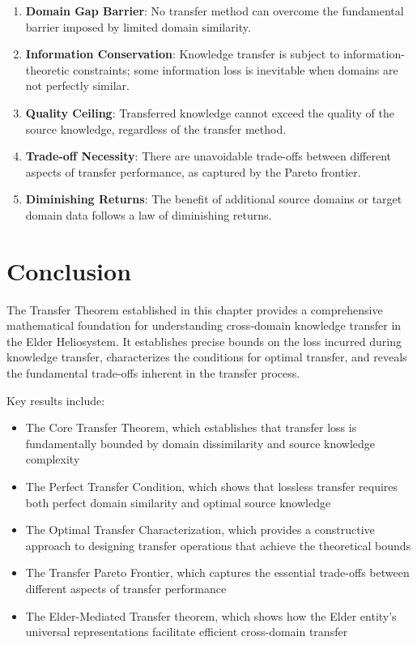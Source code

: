 \begin{enumerate}
    \item \textbf{Domain Gap Barrier}: No transfer method can overcome the fundamental barrier imposed by limited domain similarity.
    
    \item \textbf{Information Conservation}: Knowledge transfer is subject to information-theoretic constraints; some information loss is inevitable when domains are not perfectly similar.
    
    \item \textbf{Quality Ceiling}: Transferred knowledge cannot exceed the quality of the source knowledge, regardless of the transfer method.
    
    \item \textbf{Trade-off Necessity}: There are unavoidable trade-offs between different aspects of transfer performance, as captured by the Pareto frontier.
    
    \item \textbf{Diminishing Returns}: The benefit of additional source domains or target domain data follows a law of diminishing returns.
\end{enumerate}

\section{Conclusion}

The Transfer Theorem established in this chapter provides a comprehensive mathematical foundation for understanding cross-domain knowledge transfer in the Elder Heliosystem. It establishes precise bounds on the loss incurred during knowledge transfer, characterizes the conditions for optimal transfer, and reveals the fundamental trade-offs inherent in the transfer process.

Key results include:
\begin{itemize}
    \item The Core Transfer Theorem, which establishes that transfer loss is fundamentally bounded by domain dissimilarity and source knowledge complexity
    \item The Perfect Transfer Condition, which shows that lossless transfer requires both perfect domain similarity and optimal source knowledge
    \item The Optimal Transfer Characterization, which provides a constructive approach to designing transfer operations that achieve the theoretical bounds
    \item The Transfer Pareto Frontier, which captures the essential trade-offs between different aspects of transfer performance
    \item The Elder-Mediated Transfer theorem, which shows how the Elder entity's universal representations facilitate efficient cross-domain transfer
\end{itemize}

